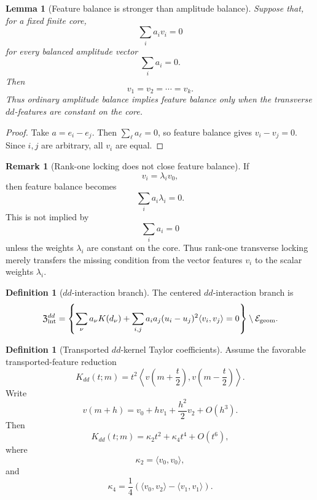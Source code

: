 \documentclass[11pt,a4paper]{amsart}
\theoremstyle{plain}
\newtheorem{lemma}[theorem]{Lemma}
\theoremstyle{definition}
\newtheorem{definition}[theorem]{Definition}
\newtheorem{remark}[theorem]{Remark}
\begin{document}
\begin{lemma}[Feature balance is stronger than amplitude balance]
\label{lem:feature-balance-stronger-than-amplitude-balance}
Suppose that, for a fixed finite core,
\[
\sum_i a_i v_i=0
\]
for every balanced amplitude vector
\[
\sum_i a_i=0.
\]
Then
\[
v_1=v_2=\cdots=v_k.
\]
Thus ordinary amplitude balance implies feature balance only when the
transverse \(dd\)-features are constant on the core.
\end{lemma}

\begin{proof}
Take \(a=e_i-e_j\).  Then \(\sum_\ell a_\ell=0\), so feature balance gives
\(v_i-v_j=0\).  Since \(i,j\) are arbitrary, all \(v_i\) are equal.
\end{proof}

\begin{remark}[Rank-one locking does not close feature balance]
\label{rem:rank-one-locking-does-not-close-feature-balance}
If
\[
v_i=\lambda_i v_0,
\]
then feature balance becomes
\[
\sum_i a_i\lambda_i=0.
\]
This is not implied by
\[
\sum_i a_i=0
\]
unless the weights \(\lambda_i\) are constant on the core.  Thus rank-one
transverse locking merely transfers the missing condition from the vector
features \(v_i\) to the scalar weights \(\lambda_i\).
\end{remark}

\begin{definition}[\(dd\)-interaction branch]
\label{def:dd-interaction-branch-current}
The centered \(dd\)-interaction branch is
\[
\mathfrak Z_{\rm int}^{dd}
=
\left\{
\sum_\nu a_\nu K(d_\nu)
+
\sum_{i,j}a_i a_j
(u_i-u_j)^2\langle v_i,v_j\rangle
=0
\right\}
\setminus\mathcal E_{\rm geom}.
\]
\end{definition}

\begin{definition}[Transported \(dd\)-kernel Taylor coefficients]
\label{def:transported-dd-kernel-taylor}
Assume the favorable transported-feature reduction
\[
K_{dd}(t;m)
=
t^2
\left\langle
v\!\left(m+\frac t2\right),
v\!\left(m-\frac t2\right)
\right\rangle.
\]
Write
\[
v(m+h)
=
v_0+h v_1+\frac{h^2}{2}v_2+O(h^3).
\]
Then
\[
K_{dd}(t;m)
=
\kappa_2t^2+\kappa_4t^4+O(t^6),
\]
where
\[
\kappa_2=\langle v_0,v_0\rangle,
\]
and
\[
\kappa_4
=
\frac14
\left(
\langle v_0,v_2\rangle-\langle v_1,v_1\rangle
\right).
\]
\end{definition}
\end{document}
